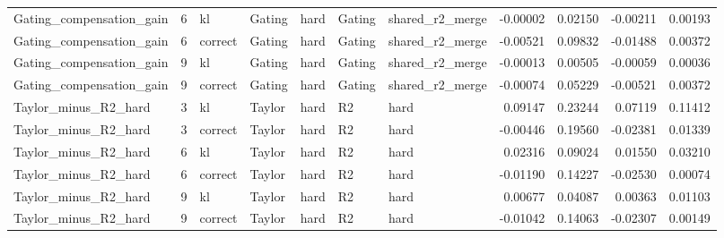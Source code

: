 \begin{tabular}{lrlllllrrrr}
Gating_compensation_gain & 6 & kl & Gating & hard & Gating & shared_r2_merge & -0.00002 & 0.02150 & -0.00211 & 0.00193 \\
Gating_compensation_gain & 6 & correct & Gating & hard & Gating & shared_r2_merge & -0.00521 & 0.09832 & -0.01488 & 0.00372 \\
Gating_compensation_gain & 9 & kl & Gating & hard & Gating & shared_r2_merge & -0.00013 & 0.00505 & -0.00059 & 0.00036 \\
Gating_compensation_gain & 9 & correct & Gating & hard & Gating & shared_r2_merge & -0.00074 & 0.05229 & -0.00521 & 0.00372 \\
Taylor_minus_R2_hard & 3 & kl & Taylor & hard & R2 & hard & 0.09147 & 0.23244 & 0.07119 & 0.11412 \\
Taylor_minus_R2_hard & 3 & correct & Taylor & hard & R2 & hard & -0.00446 & 0.19560 & -0.02381 & 0.01339 \\
Taylor_minus_R2_hard & 6 & kl & Taylor & hard & R2 & hard & 0.02316 & 0.09024 & 0.01550 & 0.03210 \\
Taylor_minus_R2_hard & 6 & correct & Taylor & hard & R2 & hard & -0.01190 & 0.14227 & -0.02530 & 0.00074 \\
Taylor_minus_R2_hard & 9 & kl & Taylor & hard & R2 & hard & 0.00677 & 0.04087 & 0.00363 & 0.01103 \\
Taylor_minus_R2_hard & 9 & correct & Taylor & hard & R2 & hard & -0.01042 & 0.14063 & -0.02307 & 0.00149 \\
\bottomrule
\end{tabular}
